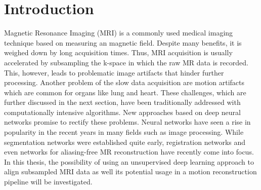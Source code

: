 
\chapter{Introduction} \label{Ch:Introduction}
Magnetic Resonance Imaging (MRI) is a commonly used medical imaging technique based on measuring an magnetic field. 
Despite many benefits, it is weighed down by long acquisition times.
Thus, MRI acquisition is usually accelerated by subsampling the k-space in which the raw MR data is recorded. This, however, leads to problematic image artifacts that hinder further processing. Another problem of the slow data acquisition are motion artifacts which are common for organs like lung and heart. 
These challenges, which are further discussed in the next section, have been traditionally addressed with computationally intensive algorithms.
New approaches based on deep neural networks promise to rectify these problems. Neural networks have seen a rise in popularity in the recent years in many fields such as image processing. While segmentation networks were established quite early, registration networks and even networks for aliasing-free MR reconstruction have recently come into focus. %
In this thesis, the possibility of using an unsupervised deep learning approach to align subsampled MRI data as well its potential usage in a motion reconstruction pipeline will be investigated.

